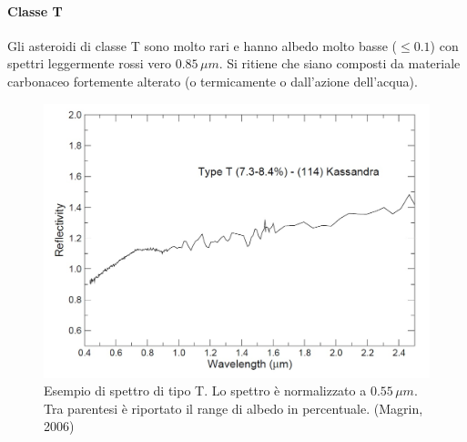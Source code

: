 \documentclass[a4paper,11pt,openright]{book}
\begin{document}
\paragraph*{Classe T}
Gli asteroidi di classe T sono molto rari e hanno albedo molto basse ($\leq 0.1$) con spettri leggermente rossi vero $0.85\,\mu m$. Si ritiene che siano composti da materiale carbonaceo fortemente
alterato (o termicamente o dall'azione dell'acqua).

\begin{figure}
    \centering
    \includegraphics[scale=0.3]{figure/spettro_t.jpg}
    \caption[Esempio di spettro di tipo T.]{Esempio di spettro di tipo T. Lo spettro è normalizzato a $0.55\,\mu m$. Tra parentesi è riportato il range di albedo in percentuale. (Magrin, 2006)}
    \label{spettro_t}
\end{figure}
\end{document}
